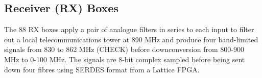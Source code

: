 \subsection{Receiver (RX) Boxes}
The 88 RX boxes apply a pair of analogue filters in series to each input to filter out a local telecommunications tower at 890 MHz and produce four band-limited signals from 830 to 862 MHz (CHECK) before downconversion from 800-900 MHz to 0-100 MHz. The signals are 8-bit complex sampled before being sent down four fibres using SERDES format from a Lattice FPGA.
